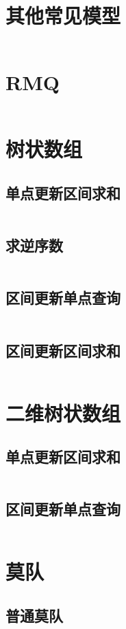 \documentclass[a4paper,11pt]{article}
\begin{document}
\section*{其他常见模型}
\inputminted[]{c++}{Template/Segment/OtherModel.cpp}
\section*{RMQ}
\inputminted[]{c++}{Template/Segment/RMQ.cpp}
\section*{树状数组}
\subsection*{单点更新区间求和}
\inputminted[]{c++}{Template/Segment/TreeArrayI.cpp}
\subsection*{求逆序数}
\inputminted[]{c++}{Template/Segment/Reverse.cpp}
\subsection*{区间更新单点查询}
\inputminted[]{c++}{Template/Segment/TreeArrayII.cpp}
\subsection*{区间更新区间求和}
\inputminted[]{c++}{Template/Segment/TreeArrayIII.cpp}
\section*{二维树状数组}
\subsection*{单点更新区间求和}
\inputminted[]{c++}{Template/Segment/TwoDimTreeArrayI.cpp}
\subsection*{区间更新单点查询}
\inputminted[]{c++}{Template/Segment/TwoDimTreeArrayII.cpp}
\section*{莫队}
\subsection*{普通莫队}
\inputminted[]{c++}{Template/Segment/bzoj2038.cpp}
\end{document}
